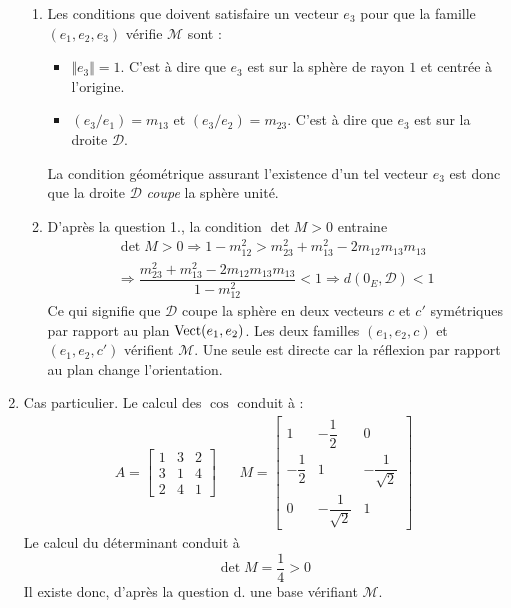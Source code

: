 \begin{enumerate}
\begin{enumerate}
\item Les conditions que doivent satisfaire un vecteur $e_3$ pour que la famille $(e_1,e_2,e_3)$ vérifie $\mathcal M$ sont :
\begin{itemize}
 \item $\Vert e_3\Vert =1$. C'est à dire que $e_3$ est sur la sphère de rayon $1$ et centrée à l'origine.
\item $(e_3/e_1)=m_{13}$ et $(e_3/e_2)=m_{23}$. C'est à dire que $e_3$ est sur la droite $\mathcal D$.
\end{itemize}
La condition géométrique assurant l'existence d'un tel vecteur $e_3$ est donc que la droite $\mathcal D$ \emph{coupe} la sphère unité.
\item D'après la question 1., la condition $\det M > 0$ entraine
\begin{multline*}
 \det M > 0 \Rightarrow 1-m_{12}^2 > m_{23}^2 + m_{13}^2-2m_{12}m_{13}m_{13} \\
\Rightarrow
\dfrac{m_{23}^2 + m_{13}^2-2m_{12}m_{13}m_{13}}{1-m_{12}^2}<1
\Rightarrow d(0_E,\mathcal D)<1
\end{multline*}
Ce qui signifie que $\mathcal D$ coupe la sphère en deux vecteurs $c$ et $c'$ symétriques par rapport au plan $\operatorname{Vect}(e_1,e_2)$. Les deux familles $(e_1,e_2,c)$ et $(e_1,e_2,c')$ vérifient $\mathcal M$. Une seule est directe car la réflexion par rapport au plan change l'orientation.
\end{enumerate}

\item Cas particulier. Le calcul des $\cos$ conduit à :
\begin{align*}
 A= \begin{bmatrix}
 1 & 3 & 2 \\
3 & 1 & 4 \\
2 & 4 & 1
\end{bmatrix}
& &
M=
\begin{bmatrix}
 1 & -\dfrac{1}{2} & 0 \\
-\dfrac{1}{2} & 1 & -\dfrac{1}{\sqrt{2}}\\
0 & -\dfrac{1}{\sqrt{2}} & 1
\end{bmatrix}
\end{align*}
Le calcul du déterminant conduit à 
\begin{displaymath}
 \det M = \dfrac{1}{4}>0
\end{displaymath}
Il existe donc, d'après la question d. une base vérifiant $\mathcal M$.
\end{enumerate}

